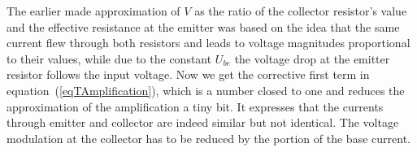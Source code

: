 The earlier made approximation of $V$ as the ratio of the collector
resistor's value and the effective resistance at the emitter was based on
the idea that the same current flew through both resistors and leads to
voltage magnitudes proportional to their values, while due to the constant
$U_{be}$ the voltage drop at the emitter resistor follows the input
voltage. Now we get the corrective first term in
equation~(\ref{eqTAmplification}), which is a number closed to one and
reduces the approximation of the amplification a tiny bit. It expresses
that the currents through emitter and collector are indeed similar but not
identical. The voltage modulation at the collector has to be reduced by
the portion of the base current.

%
% 
% 
% 
% 
% 
% 
% 
% 



